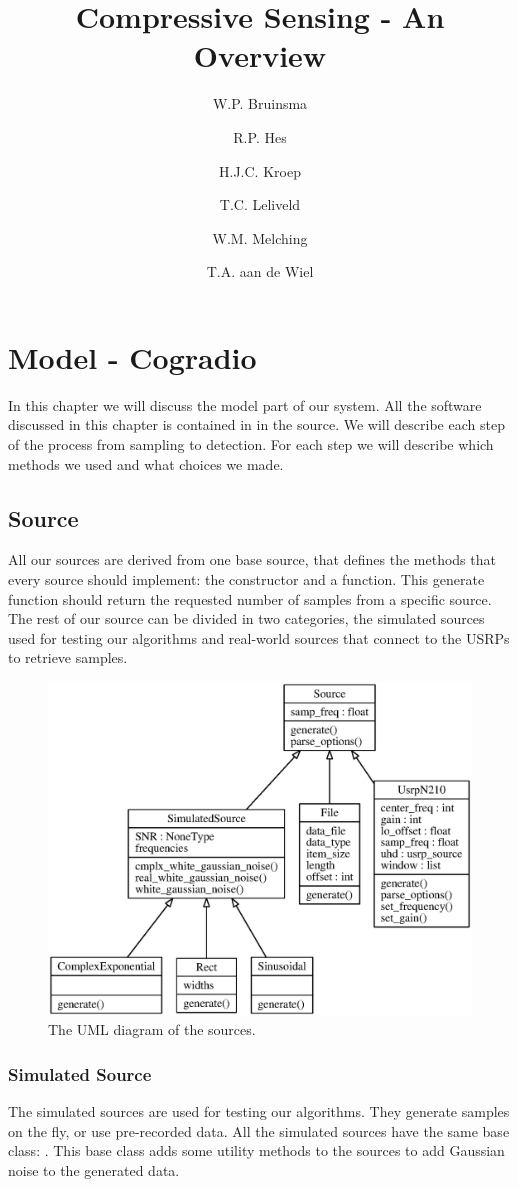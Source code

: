 \documentclass[a4paper, openany, oneside]{memoir}
\title{Compressive Sensing - An Overview}
\author{W.P. Bruinsma \and R.P. Hes \and H.J.C. Kroep \and T.C. Leliveld \and W.M. Melching \and T.A. aan de Wiel}
\begin{document}
\chapter{Model - Cogradio}
\label{cha:model}
In this chapter we will discuss the model part of our system. All the software discussed in this chapter is contained in  in the source. We will describe each step of the process from sampling to detection. For each step we will describe which methods we used and what choices we made.

\section{Source}
\label{sec:source}
All our sources are derived from one base source, that defines the methods that every source should implement: the constructor and a  function. This generate function should return the requested number of samples from a specific source. The rest of our source can be divided in two categories, the simulated sources used for testing our algorithms and real-world sources that connect to the USRPs to retrieve samples.

\begin{figure}
    \centering
    \includegraphics[width=\linewidth]{figures/classes_source.eps}
    \caption{The UML diagram of the sources.}
    \label{fig:umlsource}
\end{figure}

\subsection{Simulated Source}
\label{sec:simulated-source}
The simulated sources are used for testing our algorithms. They generate samples on the fly, or use pre-recorded data. All the simulated sources have the same base class: . This base class adds some utility methods to the sources to add Gaussian noise to the generated data.
\end{document}
